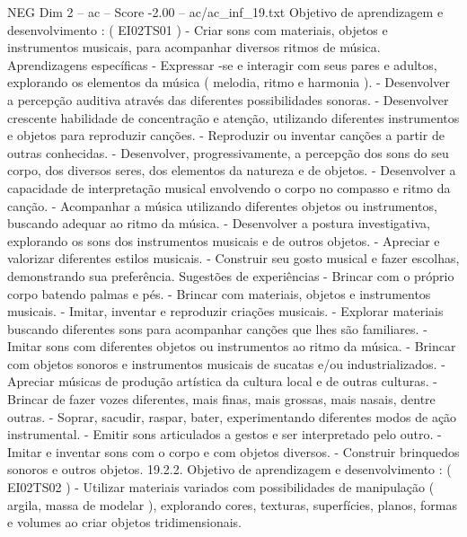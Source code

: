 \begin{textsample}{NEG Dim 2 – ac – Score -2.00 – ac/ac\_inf\_19.txt}
Objetivo de aprendizagem e desenvolvimento : ( EI02TS01 ) - Criar sons com materiais, objetos e instrumentos musicais, para acompanhar diversos ritmos de música.
Aprendizagens específicas - Expressar -se e interagir com seus pares e adultos, explorando os elementos da música ( melodia, ritmo e harmonia ). - Desenvolver a percepção auditiva através das diferentes possibilidades sonoras. - Desenvolver crescente habilidade de concentração e atenção, utilizando diferentes instrumentos e objetos para reproduzir canções. - Reproduzir ou inventar canções a partir de outras conhecidas. - Desenvolver, progressivamente, a percepção dos sons do seu corpo, dos diversos seres, dos elementos da natureza e de objetos. - Desenvolver a capacidade de interpretação musical envolvendo o corpo no compasso e ritmo da canção. - Acompanhar a música utilizando diferentes objetos ou instrumentos, buscando adequar ao ritmo da música. - Desenvolver a postura investigativa, explorando os sons dos instrumentos musicais e de outros objetos. - Apreciar e valorizar diferentes estilos musicais. - Construir seu gosto musical e fazer escolhas, demonstrando sua preferência.
Sugestões de experiências - Brincar com o próprio corpo batendo palmas e pés. - Brincar com materiais, objetos e instrumentos musicais. - Imitar, inventar e reproduzir criações musicais. - Explorar materiais buscando diferentes sons para acompanhar canções que lhes são familiares. - Imitar sons com diferentes objetos ou instrumentos ao ritmo da música. - Brincar com objetos sonoros e instrumentos musicais de sucatas e/ou industrializados. - Apreciar músicas de produção artística da cultura local e de outras culturas. - Brincar de fazer vozes diferentes, mais finas, mais grossas, mais nasais, dentre outras. - Soprar, sacudir, raspar, bater, experimentando diferentes modos de ação instrumental. - Emitir sons articulados a gestos e ser interpretado pelo outro. - Imitar e inventar sons com o corpo e com objetos diversos. - Construir brinquedos sonoros e outros objetos. 19.2.2.
Objetivo de aprendizagem e desenvolvimento : ( EI02TS02 ) - Utilizar materiais variados com possibilidades de manipulação ( argila, massa de modelar ), explorando cores, texturas, superfícies, planos, formas e volumes ao criar objetos tridimensionais.

\end{textsample}
